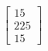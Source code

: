 \documentclass[preview]{standalone}
\begin{document}
\begin{align*}
\begin{bmatrix} 15 \\ 225 \\ 15 \end{bmatrix}
\end{align*}
\end{document}
